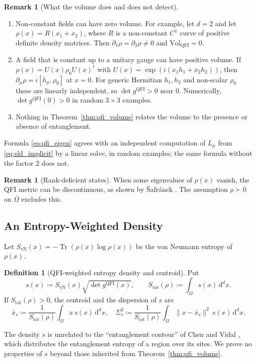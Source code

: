 \documentclass[11pt,a4paper,reqno]{amsart}
\theoremstyle{definition}
\newtheorem{definition}[theorem]{Definition}
\newtheorem{remark}[theorem]{Remark}
\numberwithin{equation}{section}
\newcommand{\Tr}{\operatorname{Tr}}
\newcommand{\dif}{\,\mathrm{d}}
\begin{document}
\begin{remark}[What the volume does and does not detect]
\label{rem:qfi_examples}
\begin{enumerate}[label=(\roman*)]
    \item Non-constant fields can have zero volume. For example, let $d = 2$ and let $\rho(x) = R(x_1 + x_2)$, where $R$ is a non-constant $C^1$ curve of positive definite density matrices. Then $\partial_1\rho = \partial_2\rho \ne 0$ and $\mathrm{Vol}_{\mathrm{QFI}} = 0$.
    \item A field that is constant up to a unitary gauge can have positive volume. If $\rho(x) = U(x)\rho_0U(x)^\dagger$ with $U(x) = \exp(i(x_1h_1 + x_2h_2))$, then $\partial_\mu\rho = i[h_\mu, \rho_0]$ at $x = 0$. For generic Hermitian $h_1, h_2$ and non-scalar $\rho_0$ these are linearly independent, so $\det g^{\mathrm{QFI}} > 0$ near $0$. Numerically, $\det g^{\mathrm{QFI}}(0) > 0$ in random $3 \times 3$ examples.
    \item Nothing in Theorem~\ref{thm:qfi_volume} relates the volume to the presence or absence of entanglement.
\end{enumerate}
Formula \eqref{eq:qfi_eigen} agrees with an independent computation of $L_\mu$ from \eqref{eq:sld_implicit} by a linear solve, in random examples; the same formula without the factor $2$ does not.
\end{remark}

\begin{remark}[Rank-deficient states]
When some eigenvalues of $\rho(x)$ vanish, the QFI metric can be discontinuous, as shown by {\v{S}}afr{\'a}nek \cite{safranek2017discontinuities}. The assumption $\rho \succ 0$ on $\overline{\Omega}$ excludes this.
\end{remark}

\subsection{An Entropy-Weighted Density}
Let $S_{\mathrm{vN}}(x) = -\Tr(\rho(x) \log \rho(x))$ be the von Neumann entropy of $\rho(x)$.

\begin{definition}[QFI-weighted entropy density and centroid]
Put
\begin{equation}
    s(x) \coloneqq S_{\mathrm{vN}}(x)\sqrt{\det g^{\mathrm{QFI}}(x)}, \qquad S_{\mathrm{tot}}(\rho) \coloneqq \int_\Omega s(x) \dif^d x.
\end{equation}
If $S_{\mathrm{tot}}(\rho) > 0$, the centroid and the dispersion of $s$ are
\begin{equation}
    \bar{x}_{s} \coloneqq \frac{1}{S_{\mathrm{tot}}(\rho)} \int_\Omega x \, s(x) \dif^d x, \quad \Sigma_{s}^2 \coloneqq \frac{1}{S_{\mathrm{tot}}(\rho)} \int_\Omega \|x - \bar{x}_{s}\|^2 \, s(x) \dif^d x.
\end{equation}
\end{definition}
The density $s$ is unrelated to the ``entanglement contour'' of Chen and Vidal \cite{chen2014entanglement}, which distributes the entanglement entropy of a region over its sites. We prove no properties of $s$ beyond those inherited from Theorem~\ref{thm:qfi_volume}.
\end{document}
